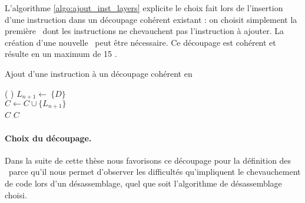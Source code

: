
L'algorithme \ref{algo:ajout_inst_layers} explicite le choix fait lors de l'insertion d'une instruction dans un découpage cohérent existant : on choisit simplement la première \layer\ dont les instructions ne chevauchent pas l'instruction à ajouter. La création d'une nouvelle \layer\ peut être nécessaire. 
Ce découpage est cohérent et résulte en un maximum de 15 \layers.

\begin{algorithm}[H] %
\caption{Ajout d'une instruction à un découpage cohérent en \layers}
\SetAlgoLined
{}
\Fn(
){}{
 {
  $L_{n+1}\leftarrow\ \{D\}$ \\
  $C\leftarrow C\cup\{L_{n+1}\}$ \\
  \Return $C$
}
{
  \Return $C$
}
}
\label{algo:ajout_inst_layers}
\end{algorithm}


\paragraph{Choix du découpage.}
Dans la suite de cette thèse nous favorisons ce découpage pour la définition des \layers\ parce qu'il nous permet d'observer les difficultés qu'impliquent le chevauchement de code lors d'un désassemblage, quel que soit l'algorithme de désassemblage choisi.

